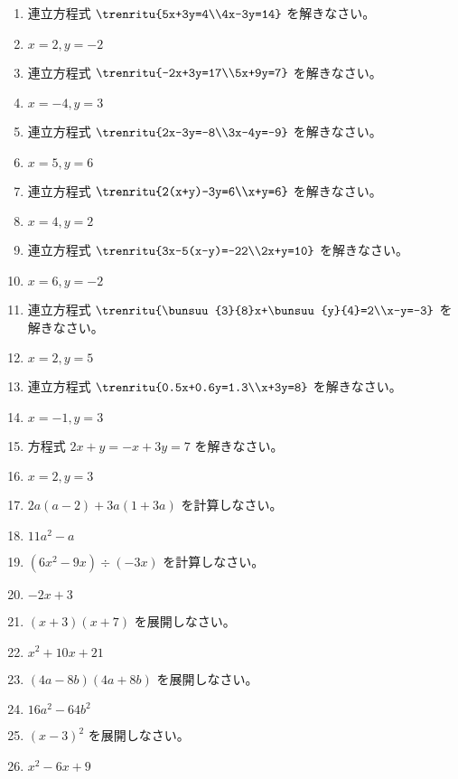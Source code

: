 \documentclass[uplatex,a4j,11pt]{jsreport}
\begin{document}
\begin{multicols}{2}
\begin{enumerate}
    \item 連立方程式 $\trenritu{5x+3y=4\\4x-3y=14}$ を解きなさい。%
    \item $x=2, y=-2$
    \item 連立方程式 $\trenritu{-2x+3y=17\\5x+9y=7}$ を解きなさい。%
    \item $x=-4, y=3$
    \item 連立方程式 $\trenritu{2x-3y=-8\\3x-4y=-9}$ を解きなさい。%
    \item $x=5, y=6$
    \item 連立方程式 $\trenritu{2(x+y)-3y=6\\x+y=6}$ を解きなさい。%
    \item $x=4, y=2$
    \item 連立方程式 $\trenritu{3x-5(x-y)=-22\\2x+y=10}$ を解きなさい。%
    \item $x=6, y=-2$
    \item 連立方程式 $\trenritu{\bunsuu{3}{8}x+\bunsuu{y}{4}=2\\x-y=-3}$ を解きなさい。%
    \item $x=2, y=5$
    \item 連立方程式 $\trenritu{0.5x+0.6y=1.3\\x+3y=8}$ を解きなさい。%
    \item $x=-1, y=3$
    \item 方程式 $2x+y = -x+3y = 7$ を解きなさい。%
    \item $x=2, y=3$
    \item $2a(a-2)+3a(1+3a)$ を計算しなさい。%
    \item $11a^2-a$
    \item $(6x^2-9x)\div(-3x)$ を計算しなさい。%
    \item $-2x+3$
    \item $(x+3)(x+7)$ を展開しなさい。%
    \item $x^2+10x+21$
    \item $(4a-8b)(4a+8b)$ を展開しなさい。%
    \item $16a^2-64b^2$
    \item $(x-3)^2$ を展開しなさい。%
    \item $x^2-6x+9$

\end{enumerate}
\end{multicols}
\end{document}
